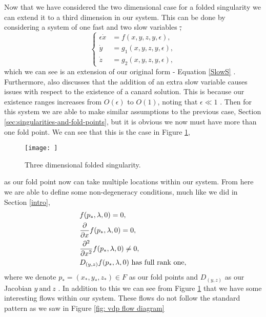 
Now that we have considered the two dimensional case for a folded singularity we can extend it to a third dimension in our system. This can be done by considering a system of one fast and two slow variables \st, 
\begin{equation}
\begin{cases}
\epsilon \dot{x}&=f(x,y,z,y,\epsilon),\\
\dot{y}&=g_1(x,y,z,y,\epsilon),\\
\dot{z}&=g_2(x,y,z,y,\epsilon),
\end{cases}
\end{equation}
which we can see is an extension of our original form - Equation \ref{SlowS} \citep{MMO}. Furthermore, \citet{MMO} also discusses that the addition of an extra slow variable causes issues with respect to the existence of a canard solution. This is because our existence ranges increases from $ O(\epsilon) $ to $ O(1) $, noting that $ \epsilon\ll 1 $ \citep{MMO}. Then for this system we are able to make similar assumptions to the previous case, Section \ref{sec:singularities-and-fold-points}, but it is obvious we now must have more than one fold point. We can see that this is the case in Figure \ref{fig: 3d folded singularity},
\begin{figure}[h!]\centering
	\texttt{[image: ]}
	\caption{Three dimensional folded singularity.}
	\label{fig: 3d folded singularity}
\end{figure}
as our fold point now can take multiple locations within our system. From here we are able to define some non-degeneracy conditions, much like we did in Section \ref{intro},
\begin{equation}
\begin{aligned}
&f(p_*,\lambda,0)=0,\\
&\pd{}{x}f(p_*,\lambda,0)=0,\\
&\pd{^2}{x^2}f(p_*,\lambda,0)\neq 0,\\
&D_{(y,z)}f(p_*,\lambda,0) \ \text{has full rank one},
\end{aligned}	
\end{equation}
where we denote $ p_*=(x_*,y_*,z_*)\in F $ as our fold points and $ D_{(y,z)} $ as our Jacobian \wrt $ y \ \text{and}\ z $ \citep{MMO}. In addition to this we can see from Figure \ref{fig: 3d folded singularity} that we have some interesting flows within our system. These flows do not follow the standard pattern as we saw in Figure \ref{fig: vdp flow diagram}

